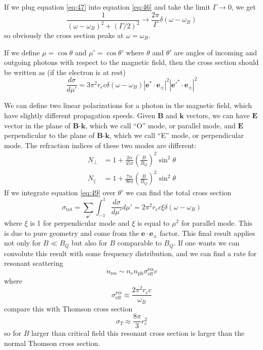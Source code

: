 \documentclass[letterpaper, 11pt]{article}
\numberwithin{equation}{section}
\numberwithin{figure}{section}
\begin{document}
If we plug equation \eqref{eq:47} into equation \eqref{eq:46} and take the limit $\Gamma \to 0$, we get
\begin{equation}
    \label{eq:48}
    \frac{1}{(\omega - \omega_B)^2 + (\Gamma/2)^2}\longrightarrow\frac{2\pi}{\Gamma}\delta(\omega - \omega_B)
\end{equation}
so obviously the cross section peaks at $\omega = \omega_B$.

If we define $\mu = \cos\theta$ and $\mu' = \cos\theta'$ where $\theta$ and $\theta'$ are angles of incoming and outgoing photons with respect to the magnetic field, then the cross section should be written as (if the electron is at rest)
\begin{equation}
    \label{eq:49}
    \frac{d\sigma}{d\mu'} = 3\pi^2r_ec\delta(\omega - \omega_B)\left| \boldsymbol{e}^{*}\cdot \boldsymbol{e}_\pm \right|^2 \left| \boldsymbol{e}'^{*}\cdot \boldsymbol{e}_\pm \right|^2
\end{equation}

We can define two linear polarizations for a photon in the magnetic field, which have slightly different propagation speeds. Given $\boldsymbol{B}$ and $\boldsymbol{k}$ vectors, we can have $\boldsymbol{E}$ vector in the plane of $\boldsymbol{B}$-$\boldsymbol{k}$, which we call ``O'' mode, or parallel mode, and $\boldsymbol{E}$ perpendicular to the plane of $\boldsymbol{B}$-$\boldsymbol{k}$, which we call ``E'' mode, or perpendicular mode. The refraction indices of these two modes are different:
\begin{align}
    \label{eq:50}
  N_{\perp} &= 1 + \frac{2\alpha}{45\pi} \left( \frac{B}{B_Q} \right)^2\sin^2\theta \\
  N_{\parallel} &= 1 + \frac{7\alpha}{90\pi} \left( \frac{B}{B_Q} \right)^2\sin^2\theta
\end{align}
If we integrate equation \eqref{eq:49} over $\theta'$ we can find the total cross section
\begin{equation}
    \label{eq:51}
    \sigma_\mathrm{tot} = \sum_{\boldsymbol{e}'}\int_{-1}^1\frac{d\sigma}{d\mu'}d\mu' = 2\pi^2 r_e c\xi \delta(\omega - \omega_B)
\end{equation}
where $\xi$ is 1 for perpendicular mode and $\xi$ is equal to $\mu^2$ for parallel mode. This is due to pure geometry and come from the $\boldsymbol{e}\cdot \boldsymbol{e}_{\pm}$ factor. This final result applies not only for $B\ll B_Q$ but also for $B$ comparable to $B_Q$. If one wants we can convolute this result with some frequency distribution, and we can find a rate for resonant scattering
\begin{equation}
    \label{eq:52}
    \dot{n}_\mathrm{res} \sim n_e n_\mathrm{ph}\sigma^\mathrm{res}_\mathrm{eff}c
\end{equation}
where
\begin{equation}
    \label{eq:53}
    \sigma^\mathrm{res}_\mathrm{eff} \approx \frac{2\pi^2r_ec}{\omega_B}
\end{equation}
compare this with Thomson cross section
\begin{equation}
    \label{eq:54}
    \sigma_T \approx \frac{8\pi}{3}r_e^{2}
\end{equation}
so for $B$ larger than critical field this resonant cross section is larger than the normal Thomson cross section.
\end{document}
